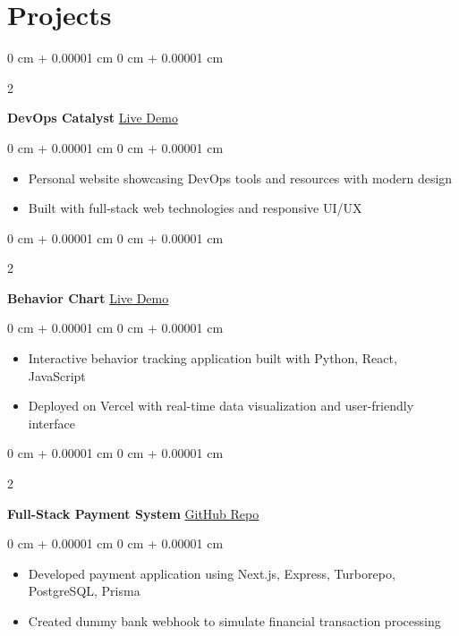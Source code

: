 \documentclass[11pt, letterpaper]{article}
\newenvironment{highlights}{
    \begin{itemize}[
        topsep=0.05 cm,
        parsep=0.05 cm,
        partopsep=0pt,
        itemsep=0pt,
        leftmargin=0 cm + 10pt
    ]
}{
    \end{itemize}
} %
\newenvironment{onecolentry}{
    \begin{adjustwidth}{
        0 cm + 0.00001 cm
    }{
        0 cm + 0.00001 cm
    }
}{
    \end{adjustwidth}
} %
\newenvironment{twocolentry}[2][]{
    \onecolentry
    \def\secondColumn{#2}
    \setcolumnwidth{\fill, 3.5 cm}
    \begin{paracol}{2}
}{
    \switchcolumn \centering \secondColumn
    \end{paracol}
    \endonecolentry
} %
\begin{document}
    \vspace{0.15 cm}

    \section{Projects}

    \begin{twocolentry}{
        \href{https://www.devopscatalyst.in/}{Live Demo}
    }
        \textbf{DevOps Catalyst}\end{twocolentry}
    \vspace{0.02 cm}
    \begin{onecolentry}
        \begin{highlights}
            \item Personal website showcasing DevOps tools and resources with modern design
            \item Built with full-stack web technologies and responsive UI/UX
        \end{highlights}
    \end{onecolentry}

    \vspace{0.1 cm}
    \begin{twocolentry}{
        \href{https://behavior-chart-by-gopal.vercel.app/}{Live Demo}
    }
        \textbf{Behavior Chart}\end{twocolentry}
    \vspace{0.02 cm}
    \begin{onecolentry}
        \begin{highlights}
            \item Interactive behavior tracking application built with Python, React, JavaScript
            \item Deployed on Vercel with real-time data visualization and user-friendly interface
        \end{highlights}
    \end{onecolentry}

    \vspace{0.1 cm}
    \begin{twocolentry}{
        \href{https://github.com/OjhaGopal/Payment_App}{GitHub Repo}
    }
        \textbf{Full-Stack Payment System}\end{twocolentry}
    \vspace{0.02 cm}
    \begin{onecolentry}
        \begin{highlights}
            \item Developed payment application using Next.js, Express, Turborepo, PostgreSQL, Prisma
            \item Created dummy bank webhook to simulate financial transaction processing
        \end{highlights}
    \end{onecolentry}
\end{document}
